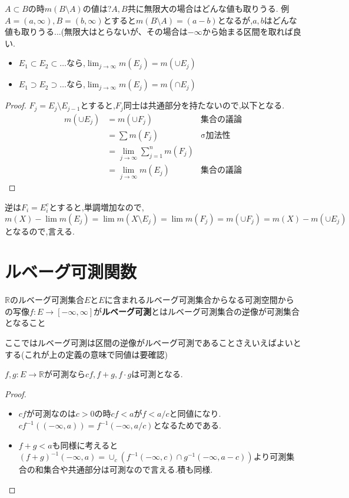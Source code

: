 \begin{rem}
$A \subset B$の時$m(B\setminus A)$の値は?$A,B$共に無限大の場合はどんな値も取りうる.
例$A= (a, \infty), B = (b, \infty)$とすると$m(B \setminus A) = (a-b)$となるが,$a,b$はどんな値も取りうる...(無限大はとらないが、その場合は$- \infty$から始まる区間を取れば良い.
\end{rem}

\begin{prop}[測度の単調収束定理]
\begin{itemize}
  \item $E_1 \subset E_2 \subset \ldots $なら,$\displaystyle \lim_{j \to \infty} m(E_j) = m(\cup E_j)$
  \item $E_1 \supset E_2 \supset \ldots $なら,$\displaystyle \lim_{j \to \infty} m(E_j) = m(\cap E_j)$
\end{itemize}
\end{prop}

\begin{proof}
$F_j = E_j \setminus E_{j-1}$とすると,$F_j$同士は共通部分を持たないので,以下となる.
\begin{align*}
m(\cup E_j) &= m(\cup F_j)  & \mbox{集合の議論}\\
            & = \sum m(F_j)  & \mbox{σ加法性}\\
            & = \lim_{j \to \infty}\sum_{j=1}^n m(F_j) \\
            & = \lim_{j \to \infty} m(E_j) & \mbox{集合の議論}
\end{align*}
\end{proof}
逆は$F_i = E_i^c$とすると,単調増加なので,$m(X) - \lim m(E_j) = \lim m(X \setminus E_j) =  \lim m(F_j)  = m(\cup F_j) = m(X) - m(\cup E_j)$となるので,言える.


\section{ルベーグ可測関数}
\begin{screen}
\begin{dfn}
  $\mathbb{R}$のルベーグ可測集合$E$と$E$に含まれるルベーグ可測集合からなる可測空間からの写像$f: E \to [-\infty, \infty]$が\textbf{ルベーグ可測}とはルベーグ可測集合の逆像が可測集合となること
\end{dfn}
\end{screen}
ここではルベーグ可測は区間の逆像がルベーグ可測であることさえいえばよいとする(これが上の定義の意味で同値は要確認)

\begin{prop}
 $f,g : E \to \mathbb{R}$が可測なら$cf, f +g, f\cdot g$は可測となる.
\end{prop}
\begin{proof}
  \begin{itemize}
    \item $cf$が可測なのは$c > 0$の時$cf < a$が$f < a/c$と同値になり.$cf^{-1}((-\infty, a)) = f ^{-1}(-\infty, a/c)$となるためである.
    \item $f + g < a$も同様に考えると$(f+g)^{-1}(-\infty , a) = \cup_c (f^{-1}(-\infty, c) \cap g^{-1}(-\infty, a-c))$より可測集合の和集合や共通部分は可測なので言える.積も同様.
  \end{itemize}
\end{proof}

